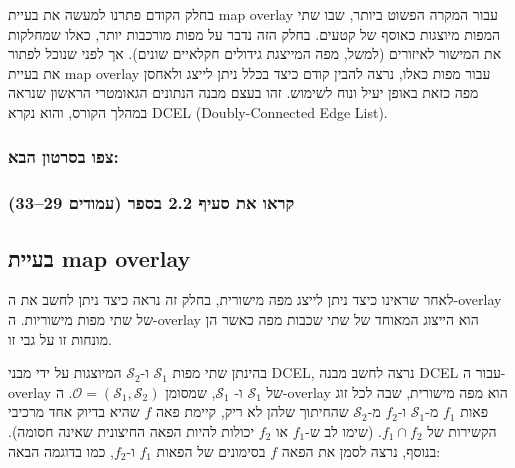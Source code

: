 \documentclass[
]{book}
\begin{document}
בחלק
הקודם פתרנו למעשה את בעיית map overlay עבור המקרה הפשוט ביותר, שבו שתי
המפות מיוצגות כאוסף של קטעים. בחלק הזה נדבר על מפות מורכבות יותר, כאלו
שמחלקות את המישור לאיזורים (למשל, מפה המייצגת גידולים חקלאיים שונים). אך
לפני שנוכל לפתור את בעיית map overlay עבור מפות כאלו, נרצה להבין קודם
כיצד בכלל ניתן לייצג ולאחסן מפה כזאת באופן יעיל ונוח לשימוש. זהו בעצם
מבנה הנתונים הגאומטרי הראשון שנראה במהלך הקורס, והוא נקרא DCEL
(Doubly-Connected Edge List).

\hypertarget{ux5e6ux5e4ux5d5-ux5d1ux5e1ux5e8ux5d8ux5d5ux5df-ux5d4ux5d1ux5d0-2}{%
\subsubsection*{צפו בסרטון הבא:}\label{ux5e6ux5e4ux5d5-ux5d1ux5e1ux5e8ux5d8ux5d5ux5df-ux5d4ux5d1ux5d0-2}}

\hypertarget{ux5e7ux5e8ux5d0ux5d5-ux5d0ux5ea-ux5e1ux5e2ux5d9ux5e3-2.2-ux5d1ux5e1ux5e4ux5e8-ux5e2ux5deux5d5ux5d3ux5d9ux5dd-2933}{%
\subsubsection*{קראו את סעיף 2.2 בספר (עמודים 29--33)}\label{ux5e7ux5e8ux5d0ux5d5-ux5d0ux5ea-ux5e1ux5e2ux5d9ux5e3-2.2-ux5d1ux5e1ux5e4ux5e8-ux5e2ux5deux5d5ux5d3ux5d9ux5dd-2933}}

\hypertarget{problem-def}{%
\subsection{בעיית map overlay}\label{problem-def}}

לאחר שראינו כיצד ניתן לייצג מפה מישורית, בחלק זה נראה כיצד ניתן לחשב את
ה-overlay של שתי מפות מישוריות. ה-overlay הוא הייצוג המאוחד של שתי שכבות
מפה כאשר הן מונחות זו על גבי זו.

בהינתן שתי מפות \(\mathcal{S_1}\) ו-\(\mathcal{S_2}\) המיוצגות על ידי מבני
DCEL, נרצה לחשב מבנה DCEL עבור ה-overlay של \(\mathcal{S_1}\) ו-
\(\mathcal{S_1}\), שמסומן \(\mathcal{O}=(\mathcal{S_1},\mathcal{S_2})\).
ה-overlay הוא מפה מישורית, שבה לכל זוג פאות \(f_1\) מ-\(\mathcal{S_1}\)
ו-\(f_2\) מ-\(\mathcal{S_2}\) שהחיתוך שלהן לא ריק, קיימת פאה \(f\) שהיא בדיוק
אחד מרכיבי הקשירות של \(f_1\cap f_2\). (שימו לב ש-\(f_1\) או \(f_2\) יכולות
להיות הפאה החיצונית שאינה חסומה). בנוסף, נרצה לסמן את הפאה \(f\) בסימונים
של הפאות \(f_1\) ו-\(f_2\), כמו בדוגמה הבאה:
\end{document}
